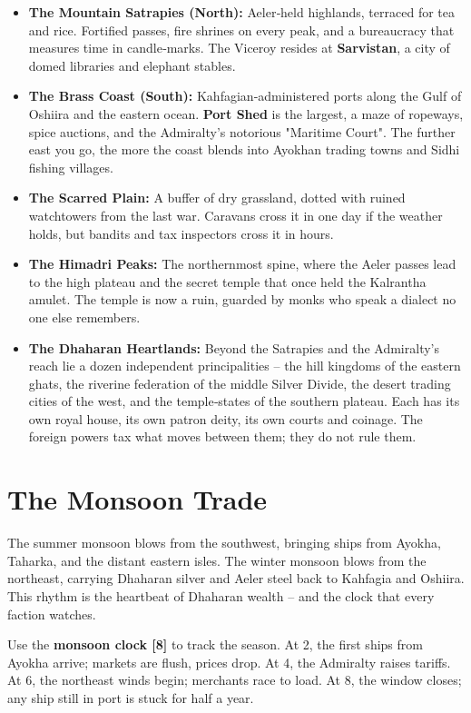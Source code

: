 \documentclass[11pt]{book}
\begin{document}
\begin{itemize}
    \item \textbf{The Mountain Satrapies (North):} Aeler‑held highlands, terraced for tea and rice. Fortified passes, fire shrines on every peak, and a bureaucracy that measures time in candle‑marks. The Viceroy resides at \textbf{Sarvistan}, a city of domed libraries and elephant stables.
    \item \textbf{The Brass Coast (South):} Kahfagian‑administered ports along the Gulf of Oshiira and the eastern ocean. \textbf{Port Shed} is the largest, a maze of ropeways, spice auctions, and the Admiralty's notorious "Maritime Court". The further east you go, the more the coast blends into Ayokhan trading towns and Sidhi fishing villages.
    \item \textbf{The Scarred Plain:} A buffer of dry grassland, dotted with ruined watchtowers from the last war. Caravans cross it in one day if the weather holds, but bandits and tax inspectors cross it in hours.
    \item \textbf{The Himadri Peaks:} The northernmost spine, where the Aeler passes lead to the high plateau and the secret temple that once held the Kalrantha amulet. The temple is now a ruin, guarded by monks who speak a dialect no one else remembers.
    \item \textbf{The Dhaharan Heartlands:} Beyond the Satrapies and the Admiralty's reach lie a dozen independent principalities -- the hill kingdoms of the eastern ghats, the riverine federation of the middle Silver Divide, the desert trading cities of the west, and the temple‑states of the southern plateau. Each has its own royal house, its own patron deity, its own courts and coinage. The foreign powers tax what moves between them; they do not rule them.
\end{itemize}

\section{The Monsoon Trade}

The summer monsoon blows from the southwest, bringing ships from Ayokha, Taharka, and the distant eastern isles. The winter monsoon blows from the northeast, carrying Dhaharan silver and Aeler steel back to Kahfagia and Oshiira. This rhythm is the heartbeat of Dhaharan wealth -- and the clock that every faction watches.

Use the \textbf{monsoon clock [8]} to track the season. At 2, the first ships from Ayokha arrive; markets are flush, prices drop. At 4, the Admiralty raises tariffs. At 6, the northeast winds begin; merchants race to load. At 8, the window closes; any ship still in port is stuck for half a year.
\end{document}
